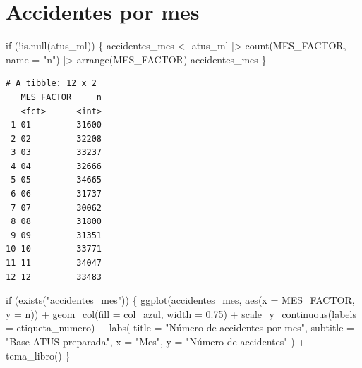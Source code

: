 \documentclass[
  spanish,
  10.5pt,
  letterpaper,
  openany,
  headings=big]{scrbook}
\newenvironment{Shaded}{}{}
\newcommand{\AttributeTok}[1]{\textcolor[rgb]{0.84,0.23,0.29}{#1}}
\newcommand{\ControlFlowTok}[1]{\textcolor[rgb]{0.84,0.23,0.29}{#1}}
\newcommand{\FloatTok}[1]{\textcolor[rgb]{0.00,0.36,0.77}{#1}}
\newcommand{\FunctionTok}[1]{\textcolor[rgb]{0.44,0.26,0.76}{#1}}
\newcommand{\NormalTok}[1]{\textcolor[rgb]{0.14,0.16,0.18}{#1}}
\newcommand{\OtherTok}[1]{\textcolor[rgb]{0.44,0.26,0.76}{#1}}
\newcommand{\SpecialCharTok}[1]{\textcolor[rgb]{0.00,0.36,0.77}{#1}}
\newcommand{\StringTok}[1]{\textcolor[rgb]{0.01,0.18,0.38}{#1}}
\begin{document}
\section{Accidentes por mes}\label{accidentes-por-mes}

\begin{Shaded}
\begin{Highlighting}[]
\ControlFlowTok{if}\NormalTok{ (}\SpecialCharTok{!}\FunctionTok{is.null}\NormalTok{(atus\_ml)) \{}
\NormalTok{  accidentes\_mes }\OtherTok{\textless{}{-}}\NormalTok{ atus\_ml }\SpecialCharTok{|\textgreater{}} \FunctionTok{count}\NormalTok{(MES\_FACTOR, }\AttributeTok{name =} \StringTok{"n"}\NormalTok{) }\SpecialCharTok{|\textgreater{}} \FunctionTok{arrange}\NormalTok{(MES\_FACTOR)}
\NormalTok{  accidentes\_mes}
\NormalTok{\}}
\end{Highlighting}
\end{Shaded}

\begin{verbatim}
# A tibble: 12 x 2
   MES_FACTOR     n
   <fct>      <int>
 1 01         31600
 2 02         32208
 3 03         33237
 4 04         32666
 5 05         34665
 6 06         31737
 7 07         30062
 8 08         31800
 9 09         31351
10 10         33771
11 11         34047
12 12         33483
\end{verbatim}

\begin{Shaded}
\begin{Highlighting}[]
\ControlFlowTok{if}\NormalTok{ (}\FunctionTok{exists}\NormalTok{(}\StringTok{"accidentes\_mes"}\NormalTok{)) \{}
  \FunctionTok{ggplot}\NormalTok{(accidentes\_mes, }\FunctionTok{aes}\NormalTok{(}\AttributeTok{x =}\NormalTok{ MES\_FACTOR, }\AttributeTok{y =}\NormalTok{ n)) }\SpecialCharTok{+}
    \FunctionTok{geom\_col}\NormalTok{(}\AttributeTok{fill =}\NormalTok{ col\_azul, }\AttributeTok{width =} \FloatTok{0.75}\NormalTok{) }\SpecialCharTok{+}
    \FunctionTok{scale\_y\_continuous}\NormalTok{(}\AttributeTok{labels =}\NormalTok{ etiqueta\_numero) }\SpecialCharTok{+}
    \FunctionTok{labs}\NormalTok{(}
      \AttributeTok{title =} \StringTok{"Número de accidentes por mes"}\NormalTok{,}
      \AttributeTok{subtitle =} \StringTok{"Base ATUS preparada"}\NormalTok{,}
      \AttributeTok{x =} \StringTok{"Mes"}\NormalTok{,}
      \AttributeTok{y =} \StringTok{"Número de accidentes"}
\NormalTok{    ) }\SpecialCharTok{+}
    \FunctionTok{tema\_libro}\NormalTok{()}
\NormalTok{\}}
\end{Highlighting}
\end{Shaded}
\end{document}
